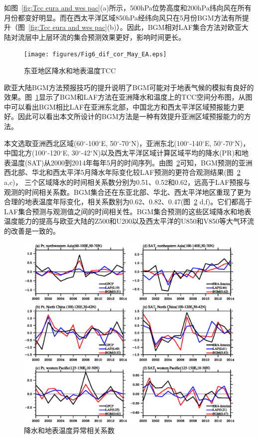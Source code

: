 如图~\ref{fig:Tcc eura and wes pac}(a)所示，500hPa位势高度和200hPa纬向风在所有月份都变好明显。而在西太平洋区域850hPa经纬向风只在5月份BGM方法有所提升（图~\ref{fig:Tcc eura and wes pac}(b)）。因此，BGM相对LAF集合方法对欧亚大陆对流层中上层环流的集合预测效果更好，影响时间更长。

\begin{figure}[H] %
  \centering
  \texttt{[image: figures/Fig6\_dif\_cor\_May\_EA.eps]}
  \caption{东亚地区降水和地表温度TCC}
  \label{fig:Tcc of ea pr and sat}
\end{figure}
欧亚大陆BGM方法预报技巧的提升说明了BGM可能对于地表气候的模拟有良好的效果。图~\ref{fig:Tcc of ea pr and sat}显示了BGM和LAF方法在亚洲降水和温度上的TCC空间分布图，从图中可以看出BGM相比LAF在亚洲东北部，中国北方和西太平洋区域预报能力更好。因此可以看出本文所设计的BGM方法是一种有效提升亚洲区域预报能力的方法。

本文选取亚洲西北区域(60$^\circ$-100$^\circ$E, 50$^\circ$-70$^\circ$N)，亚洲东北(100$^\circ$-140$^\circ$E, 50$^\circ$-70$^\circ$N)，中国北方(100$^\circ$-120$^\circ$E, 30$^\circ$-42$^\circ$N)以及西太平洋区域计算区域平均的降水(PR)和地表温度(SAT)从2000到2014年每年5月的时间序列。由图~\ref{fig:pre and sat corre}可知，BGM预测的亚洲西北部、华北和西太平洋5月降水年际变化较LAF预测的更符合观测结果(图~\ref{fig:pre and sat corre} a,c)， 三个区域降水的时间相关系数分别为0.51、0.52和0.62，远高于LAF预报与观测的时间相关系数。BGM集合还在东亚北部、华北、西太平洋地区重现了更为合理的地表温度年际变化，相关系数别为0.62、0.82、0.47(图~\ref{fig:pre and sat corre} d,f)。它们都高于LAF集合预测与观测值之间的时间相关性。BGM集合预测的这些区域降水和地表温度能力的提高与欧亚大陆的Z500和U200以及西太平洋的U850和V850等大气环流的改善是一致的。

\begin{figure}[H] %
  \centering
  \includegraphics[scale=0.8,trim=1 50 1 30,clip]{figures/Fig8_May_BGM_LAF_2000_2014.eps}
  \caption{降水和地表温度异常相关系数}
  \label{fig:pre and sat corre}
\end{figure}

